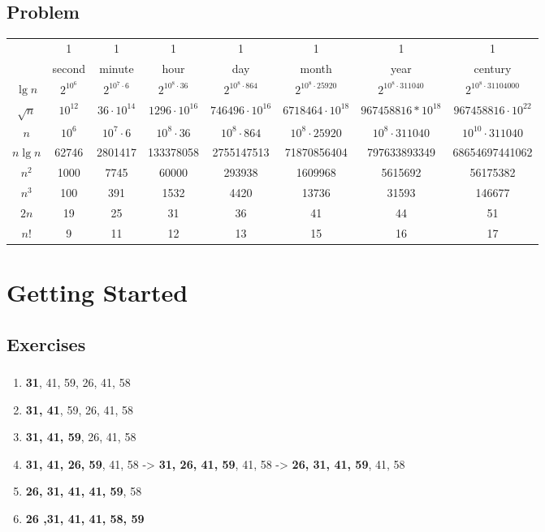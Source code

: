 \documentclass[paper=a4, fontsize=11pt,oneside]{book} %
\numberwithin{equation}{section} %
\numberwithin{figure}{section} %
\numberwithin{table}{section} %
\begin{document}
	\section{Problem}
		\begin{tabular}[b]{c|c|c|c|c|c|c|c}
			& 1&1&1&1&1&1&1 \\
			& second & minute & hour & day & month & year & century \\   \hline
			$\lg n$ & $2^{10^6}$ & $2^{10^7\cdot6}$&$2^{10^8\cdot36}$&$2^{10^8\cdot864}$&$2^{10^8\cdot25920}$&$2^{10^8\cdot311040}$&$2^{10^8\cdot31104000}$ \\  \hline
			$\sqrt{n}$&$10^{12}$&$36\cdot10^{14}$&$1296\cdot10^{16}$&$746496\cdot10^{16}$&$6718464\cdot10^{18}$&$967458816*10^{18}$&$967458816\cdot10^{22}$ \\ \hline
			$n$&$10^6$&$10^7\cdot6$&$10^8\cdot36$&$10^8\cdot864$&$10^8\cdot25920$&$10^8\cdot311040$&$10^{10}\cdot311040$ \\ \hline
			$n\lg n$&62746&2801417&133378058&2755147513&71870856404&	797633893349&	68654697441062 \\ \hline
			$n^2$&	1000&	7745	&60000&	293938	&1609968	&5615692&	56175382 \\ \hline
			$n^3$&	100&	391&	1532	&4420	&13736&	31593	&146677\\ \hline
 			$2n$&	19&	25&	31&	36&	41&	44&	51 \\ \hline
			$n!$&	9	&11&	12&	13&	15&	16&	17  \\
			\hline
		\end{tabular}

	


\newpage


\chapter{Getting Started} 

	\section{Exercises}
		\subsection{}
			\begin{enumerate}
				\item \textbf{31}, 41, 59, 26, 41, 58 
				\item \textbf{31, 41}, 59, 26, 41, 58
				\item \textbf{31, 41, 59}, 26, 41, 58
				\item \textbf{31, 41, 26, 59}, 41, 58 -> \textbf{31, 26, 41, 59}, 41, 58
						-> \textbf{26, 31, 41, 59}, 41, 58
				\item \textbf{26, 31, 41, 41, 59}, 58
				\item \textbf{26 ,31, 41, 41, 58, 59}
			\end{enumerate}
\end{document}

